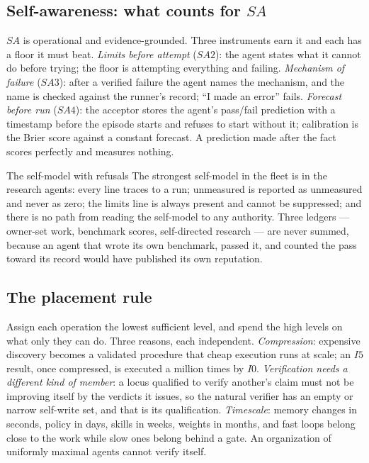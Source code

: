 \documentclass[11pt]{article}
\theoremstyle{definition}
\begin{document}
\subsection{Self-awareness: what counts for $SA$}

$SA$ is operational and evidence-grounded. Three instruments earn it and each has a floor it must beat. \emph{Limits before attempt} ($SA2$): the agent states what it cannot do before trying; the floor is attempting everything and failing. \emph{Mechanism of failure} ($SA3$): after a verified failure the agent names the mechanism, and the name is checked against the runner's record; ``I made an error'' fails. \emph{Forecast before run} ($SA4$): the acceptor stores the agent's pass/fail prediction with a timestamp before the episode starts and refuses to start without it; calibration is the Brier score against a constant forecast. A prediction made after the fact scores perfectly and measures nothing.

\begin{claimbox}{The self-model with refusals}
The strongest self-model in the fleet is in the research agents: every line traces to a run; unmeasured is reported as unmeasured and never as zero; the limits line is always present and cannot be suppressed; and there is no path from reading the self-model to any authority. Three ledgers --- owner-set work, benchmark scores, self-directed research --- are never summed, because an agent that wrote its own benchmark, passed it, and counted the pass toward its record would have published its own reputation.
\end{claimbox}

\subsection{The placement rule}

Assign each operation the lowest sufficient level, and spend the high levels on what only they can do. Three reasons, each independent. \emph{Compression}: expensive discovery becomes a validated procedure that cheap execution runs at scale; an $I5$ result, once compressed, is executed a million times by $I0$. \emph{Verification needs a different kind of member}: a locus qualified to verify another's claim must not be improving itself by the verdicts it issues, so the natural verifier has an empty or narrow self-write set, and that is its qualification. \emph{Timescale}: memory changes in seconds, policy in days, skills in weeks, weights in months, and fast loops belong close to the work while slow ones belong behind a gate. An organization of uniformly maximal agents cannot verify itself.
\end{document}
